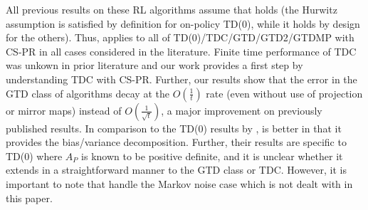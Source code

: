 All previous results on these RL algorithms assume that  holds (the Hurwitz assumption is satisfied by definition for on-policy TD(0), while it holds by design for the others). 
Thus,  applies to all of TD(0)/TDC/GTD/GTD2/GTDMP with CS-PR in all cases considered in the literature.
Finite time performance of TDC was unkown in prior literature and our work provides a first step by understanding TDC with CS-PR. 
Further, our results show that the error in the GTD class of algorithms decay at the $O(\frac{1}{t})$ rate (even without use of projection or mirror maps) instead of $O(\frac{1}{\sqrt{t}})$, a major improvement on previously published results. In comparison to the TD(0) results by \citet{korda-prashanth},  is better in that it provides the bias/variance decomposition. Further, their results are specific to TD(0) where $A_P$ is known to be positive definite, and it is unclear whether it extends in a straightforward manner to the GTD class or TDC. 
However, it is important to note that \citet{korda-prashanth} handle the Markov noise case which is not dealt with in this paper. 
